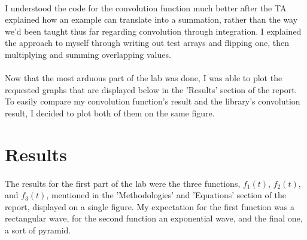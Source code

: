 \documentclass[12pt]{report}
\begin{document}
    \paragraph{} I understood the code for the convolution function much better after the TA explained how an example can translate into a summation, rather than the way we'd been taught thus far regarding convolution through integration. I explained the approach to myself through writing out test arrays and flipping one, then multiplying and summing overlapping values. 

    \paragraph{} Now that the most arduous part of the lab was done, I was able to plot the requested graphs that are displayed below in the 'Results' section of the report. To easily compare my convolution function's result and the library's convolution result, I decided to plot both of them on the same figure.
    
\section{Results}


    \paragraph{} The results for the first part of the lab were the three functions, $f_1(t)$, $f_2(t)$, and $f_3(t)$, mentioned in the 'Methodologies' and 'Equations' section of the report, displayed on a single figure. My expectation for the first function was a rectangular wave, for the second function an exponential wave, and the final one, a sort of pyramid.     
\end{document}
